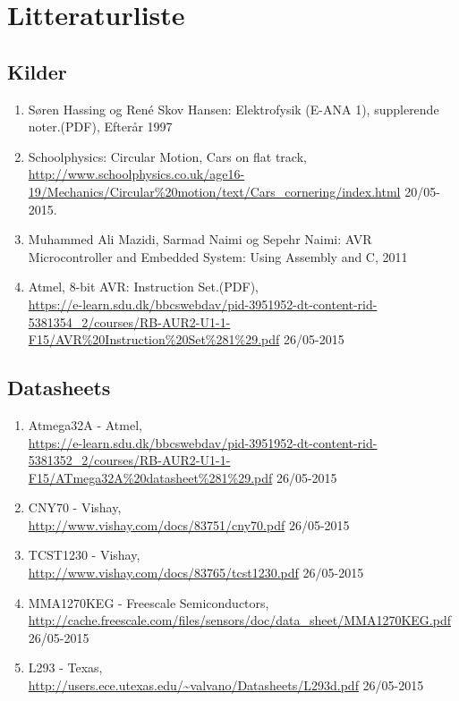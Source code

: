 \section{Litteraturliste}
\subsection{Kilder}
\begin{enumerate}
\item Søren Hassing og René Skov Hansen: Elektrofysik (E-ANA 1), supplerende noter.(PDF), Efterår 1997
\item Schoolphysics: Circular Motion, Cars on flat track, \\
\url{http://www.schoolphysics.co.uk/age16-19/Mechanics/Circular\%20motion/text/Cars_cornering/index.html} 20/05-2015.
\item Muhammed Ali Mazidi, Sarmad Naimi og Sepehr Naimi: AVR Microcontroller and Embedded System: Using Assembly and C, 2011
\item Atmel, 8-bit AVR: Instruction Set.(PDF), \\
\url{https://e-learn.sdu.dk/bbcswebdav/pid-3951952-dt-content-rid-5381354_2/courses/RB-AUR2-U1-1-F15/AVR\%20Instruction\%20Set\%281\%29.pdf} 26/05-2015
\end{enumerate}

\subsection{Datasheets}
\begin{enumerate}
\item Atmega32A - Atmel, \\
\url{https://e-learn.sdu.dk/bbcswebdav/pid-3951952-dt-content-rid-5381352_2/courses/RB-AUR2-U1-1-F15/ATmega32A\%20datasheet\%281\%29.pdf} 26/05-2015
\item CNY70 - Vishay, \\
\url{http://www.vishay.com/docs/83751/cny70.pdf} 26/05-2015
\item TCST1230 - Vishay, \\
\url{http://www.vishay.com/docs/83765/tcst1230.pdf} 26/05-2015
\item MMA1270KEG - Freescale Semiconductors, \\
\url{http://cache.freescale.com/files/sensors/doc/data_sheet/MMA1270KEG.pdf} 26/05-2015
\item L293 - Texas, \\
\url{http://users.ece.utexas.edu/~valvano/Datasheets/L293d.pdf} 26/05-2015
\end{enumerate}
